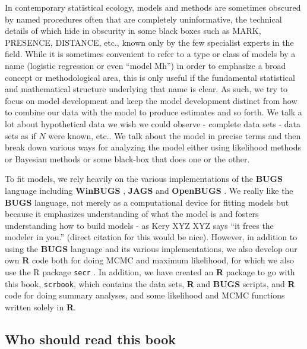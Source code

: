 In contemporary statistical ecology, models and methods are sometimes
obscured by named procedures often that are completely uninformative,
the technical details of which hide in obscurity in some black boxes
such as MARK, PRESENCE, DISTANCE, etc., known only by the few
specialist experts in the field. While it is sometimes convenient to
refer to a type or class of models by a name (logistic regression or
even ``model Mh'') in order to emphasize a broad concept or
methodological area, this is only useful if the fundamental
statistical and mathematical structure underlying that name is
clear. As such, we try to focus on model development and keep the
model development distinct from how to combine our data with the model
to produce estimates and so forth. We talk a lot about hypothetical
data we wish we could observe - complete data sets - data sets as if
$N$ were known, etc.. We talk about the model in precise terms and
then break down various ways for analyzing the model either using
likelihood methods or Bayesian methods or some black-box that does one
or the other.

To fit models, we rely heavily on the various implementations of the
{\bf BUGS} language including {\bf WinBUGS} \citep{lunn_etal:2000},
{\bf JAGS} \citep{plummer:2003}
 and {\bf OpenBUGS} \citep{thomas_etal:2006}. We really like
the {\bf BUGS} language, not merely  as a computational device for
fitting models but because it emphasizes
understanding of what the model is and fosters understanding how to
build models - as Kery XYZ XYZ says ``it frees the modeler in you.''  (direct
citation for this would be nice).  However, in addition to using the
{\bf BUGS} language and its various implementations, we also develop our own
{\bf R} code both for doing MCMC
and maximum likelihood, for which we also use the R
package \mbox{\tt secr} \citep{efford:2011}. In addition, we have
created an {\bf R} package to go with this book, \mbox{\tt scrbook},
which contains the data sets, {\bf R} and {\bf BUGS} scripts, and {\bf
  R} code for doing summary analyses, and some likelihood and MCMC
functions written solely in {\bf R}.


\subsection{Who should read this book}

